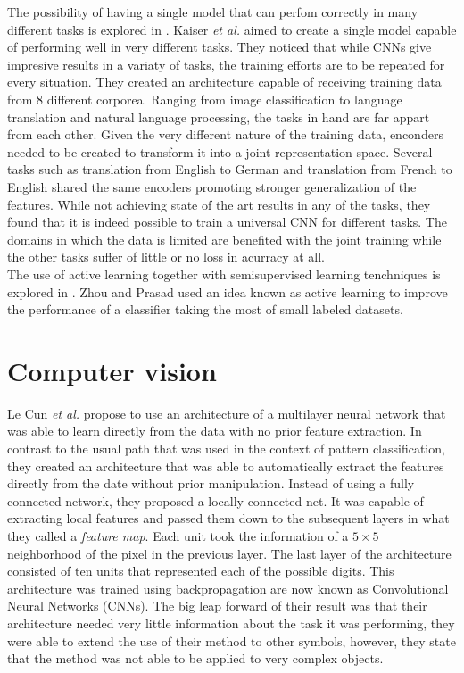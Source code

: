 The possibility of having a single model that can perfom correctly in many different tasks is explored in \cite{DBLP:journals/corr/KaiserGSVPJU17}. Kaiser \textit{et al.} aimed to create a single model capable of performing well in very different tasks. They noticed that while CNNs give impresive results in a variaty of tasks, the training efforts are to be repeated for every situation. They created an architecture capable of receiving training data from 8 different corporea. Ranging from image classification to language translation and natural language processing, the tasks in hand are far appart from each other. Given the very different nature of the training data, enconders needed to be created to transform it into a joint representation space. Several tasks such as translation from English to German and translation from French to English shared the same encoders promoting stronger generalization of the features. While not achieving state of the art results in any of the tasks, they found that it is indeed possible to train a universal CNN for different tasks. The domains in which the data is limited are benefited with the joint training while the other tasks suffer of little or no loss in acurracy at all.\\



The use of active learning together with semisupervised learning tenchniques is explored in \cite{7956153}. Zhou and Prasad used an idea known as active learning to improve the performance of a classifier taking the most of small labeled datasets.\\

\section{Computer vision}

Le Cun \textit{et al.} \cite{119325} propose to use an architecture of a multilayer neural network that was able to learn directly from the data with no prior feature extraction. In contrast to the usual path that was used in the context of pattern classification, they created an architecture that was able to automatically extract the features directly from the date without prior manipulation. Instead of using a fully connected network, they proposed a locally connected net. It was capable of extracting local features and passed them down to the subsequent layers in what they called a \textit{feature map}. Each unit took the information of a $5\times 5$ neighborhood of the pixel in the previous layer. The last layer of the architecture consisted of ten units that represented each of the possible digits. This architecture was trained using backpropagation are now known as Convolutional Neural Networks (CNNs). The big leap forward of their result was that their architecture needed very little information about the task it was performing, they were able to extend the use of their method to other symbols, however, they state that the method was not able to be applied to very complex objects.\\

